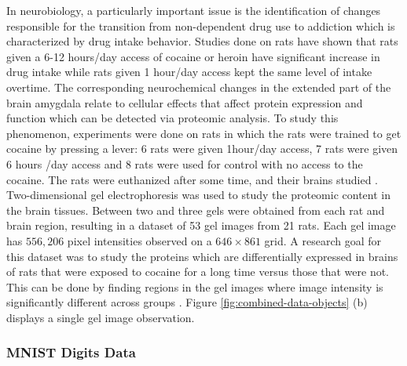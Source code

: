 In neurobiology, a particularly important issue is the identification of changes responsible for the transition from non-dependent drug use to addiction which is characterized by drug intake behavior. Studies done on rats have shown that rats given a 6-12 hours/day access of cocaine or heroin have significant increase in drug intake while rats given 1 hour/day access kept the same level of intake overtime.
The corresponding neurochemical changes in the extended part of the brain amygdala relate to cellular effects that affect protein expression and function which can be detected via proteomic analysis. To study this phenomenon, experiments were done on rats in which the rats were trained to get cocaine by pressing a lever: 6 rats were given 1hour/day access, 7 rats were given 6 hours /day access and 8 rats were used for control with no access to the cocaine. The rats were euthanized after some time, and their brains studied \parencite{morris_pinnacle_2008}. 
Two-dimensional gel electrophoresis was used to study the proteomic content in the brain tissues. 
Between two and three gels were obtained from each rat and brain region, resulting in a dataset of 53 gel images from 21 rats.
Each gel image has $556,206$ pixel intensities observed on a $646 × 861$ grid. 
A research goal for this dataset was to study the proteins which are differentially expressed in brains of rats that were exposed to cocaine for a long time versus those that were not. 
This can be done by finding regions in the gel images where image intensity is significantly different across groups \parencite{morris_statistical_2012}. 
Figure \ref{fig:combined-data-objects} (b) displays a single gel image observation.



\subsubsection{MNIST Digits Data}

